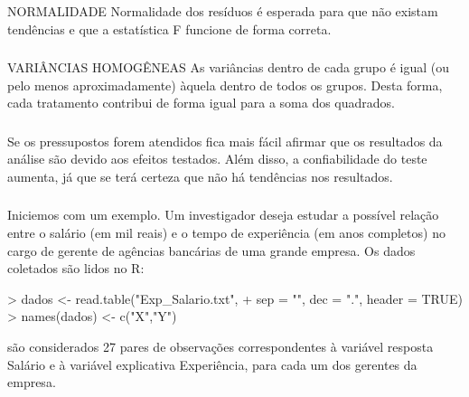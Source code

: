 \documentclass[14pt,aspectratio=1610]{beamer}
\begin{document}
\begin{frame}{}
\frametitle{ }
\begin{block}{NORMALIDADE}
\justifying
Normalidade dos resíduos é esperada para que não existam tendências e que a estatística F funcione de forma correta.
\end{block}
\end{frame}

\begin{frame}{}
\frametitle{ }
\begin{block}{VARIÂNCIAS HOMOGÊNEAS}
\justifying
As variâncias dentro de cada grupo é igual (ou pelo menos aproximadamente) àquela dentro de todos os grupos. Desta forma, cada tratamento contribui de forma igual para a soma dos quadrados.
\end{block}
\end{frame}

\begin{frame}{}
\frametitle{ }
\begin{block}{}
\justifying
Se os pressupostos forem atendidos fica mais fácil afirmar que os resultados da análise são devido aos efeitos testados. Além disso, a confiabilidade do teste aumenta, já que se terá certeza que não há tendências nos resultados.
\end{block}
\end{frame}

\begin{frame}[fragile]{}
\frametitle{ }
\begin{block}{}
\justifying
Iniciemos com um exemplo. Um investigador deseja estudar a possível relação entre o salário (em mil reais) e o tempo de experiência (em anos completos) no cargo de gerente de agências bancárias de uma grande empresa. Os dados coletados são lidos no R:
\end{block}
\begin{block}{}
\begin{Schunk}
\begin{Sinput}
> dados <- read.table("Exp_Salario.txt", 
+                     sep = "", dec = ".", header = TRUE)
> names(dados) <- c("X","Y")
\end{Sinput}
\end{Schunk}
\end{block}\pause
\begin{block}{}
são considerados 27 pares de observações correspondentes à variável resposta Salário e à variável explicativa Experiência, para cada um dos gerentes da empresa.
\end{block}
\end{frame}
\end{document}
